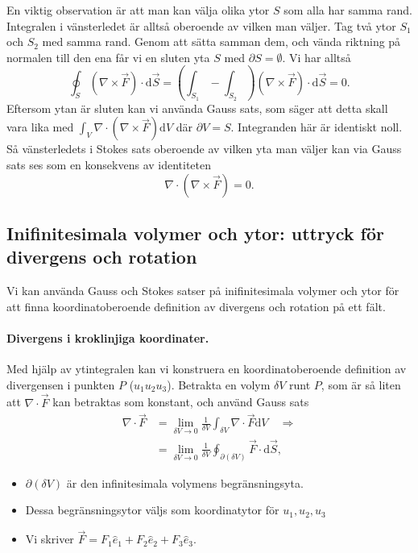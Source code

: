 \documentclass[%
oneside,                 %
final,                   %
10pt]{article}
\begin{document}
En viktig observation är att man kan välja olika ytor $S$ som alla
har samma rand. Integralen i vänsterledet är alltså oberoende
av vilken man väljer. Tag två ytor $S_1$ och $S_2$ med samma
rand. Genom att sätta samman dem, och vända riktning på
normalen till den ena får vi en sluten yta $S$ med
$\partial S=\emptyset$. Vi har alltså 
\begin{equation}
\oint_S(\nabla\times\vec{F})\cdot \mbox{d}\vec{S} = \left(\int_{S_1}-\int_{S_2}\right)(\nabla\times\vec{F})\cdot
\mbox{d}\vec{S}=0. 
\end{equation}
Eftersom ytan är sluten kan vi använda Gauss sats, som säger att detta skall vara lika med
$\int_V\nabla\cdot(\nabla\times\vec{F})\mbox{d}V$ där $\partial V=S$. Integranden här är identiskt noll. Så vänsterledets i Stokes sats oberoende av vilken yta man väljer kan via Gauss sats ses som en konsekvens av identiteten 
\begin{equation}
\nabla\cdot(\nabla\times\vec F)=0.
\end{equation}


\subsection{Inifinitesimala volymer och ytor: uttryck för divergens och rotation}

Vi kan använda Gauss och Stokes satser på inifinitesimala volymer och ytor för att finna koordinatoberoende definition av divergens och rotation på ett fält.

\paragraph{Divergens i kroklinjiga koordinater.}
Med hjälp av ytintegralen kan vi konstruera en koordinatoberoende definition av divergensen i punkten $P$ ($u_1u_2u_3$). Betrakta en volym $\delta V$ runt $P$, som är så liten att $\nabla \cdot \vec{F}$ kan betraktas som konstant, och använd Gauss sats
\begin{align}
  \nabla \cdot \vec{F} &=\lim_{\delta V \to 0} \frac{1}{\delta V} \int_{\delta V} \nabla \cdot \vec{F} \mbox{d} V \quad \Rightarrow \nonumber \\
  &= \lim_{\delta V \to 0} \frac{1}{\delta V} \oint_{\partial (\delta
V)} \vec{F} \cdot \mbox{d}\vec{S},
\end{align}
\begin{itemize}
\item $\partial (\delta V)$ är den infinitesimala volymens begränsningsyta. 

\item Dessa  begränsningsytor väljs som koordinatytor för $u_1,u_2,u_3$ 

\item Vi skriver $\vec{F} = F_1 \hat{e}_1 + F_2 \hat{e}_2 + F_3 \hat{e}_3$. 
\end{itemize}
\end{document}
